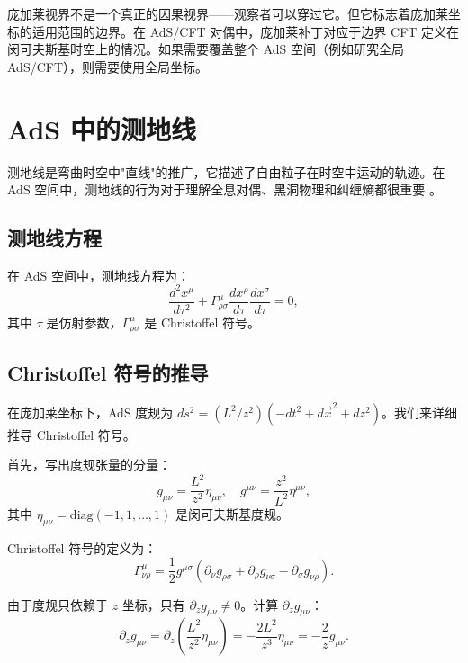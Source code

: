 \begin{remark}
庞加莱视界不是一个真正的因果视界——观察者可以穿过它。但它标志着庞加莱坐标的适用范围的边界。在 AdS/CFT 对偶中，庞加莱补丁对应于边界 CFT 定义在闵可夫斯基时空上的情况。如果需要覆盖整个 AdS 空间（例如研究全局 AdS/CFT），则需要使用全局坐标。
\end{remark}

\section{AdS 中的测地线}

测地线是弯曲时空中"直线"的推广，它描述了自由粒子在时空中运动的轨迹。在 AdS 空间中，测地线的行为对于理解全息对偶、黑洞物理和纠缠熵都很重要 \cite{Maldacena1997}。

\subsection{测地线方程}

在 AdS 空间中，测地线方程为：
\begin{equation}
    \frac{d^2 x^\mu}{d\tau^2} + \Gamma^\mu_{\rho\sigma} \frac{dx^\rho}{d\tau} \frac{dx^\sigma}{d\tau} = 0,
\end{equation}
其中 $\tau$ 是仿射参数，$\Gamma^\mu_{\rho\sigma}$ 是 Christoffel 符号。

\subsection{Christoffel 符号的推导}

在庞加莱坐标下，AdS 度规为 $ds^2 = (L^2/z^2)(-dt^2 + d\vec{x}^2 + dz^2)$。我们来详细推导 Christoffel 符号。

首先，写出度规张量的分量：
\begin{equation}
    g_{\mu\nu} = \frac{L^2}{z^2} \eta_{\mu\nu}, \quad g^{\mu\nu} = \frac{z^2}{L^2} \eta^{\mu\nu},
\end{equation}
其中 $\eta_{\mu\nu} = \text{diag}(-1, 1, \ldots, 1)$ 是闵可夫斯基度规。

Christoffel 符号的定义为：
\begin{equation}
    \Gamma^\mu_{\nu\rho} = \frac{1}{2} g^{\mu\sigma} (\partial_\nu g_{\rho\sigma} + \partial_\rho g_{\nu\sigma} - \partial_\sigma g_{\nu\rho}).
\end{equation}

由于度规只依赖于 $z$ 坐标，只有 $\partial_z g_{\mu\nu} \neq 0$。计算 $\partial_z g_{\mu\nu}$：
\begin{equation}
    \partial_z g_{\mu\nu} = \partial_z \left(\frac{L^2}{z^2} \eta_{\mu\nu}\right) = -\frac{2L^2}{z^3} \eta_{\mu\nu} = -\frac{2}{z} g_{\mu\nu}.
\end{equation}

